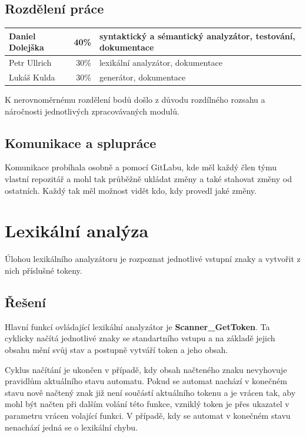 \documentclass[a4paper,11pt]{article}
\begin{document}
\subsection{Rozdělení práce} \label{podrobnosti-rozdeleni}
\noindent
\renewcommand{\arraystretch}{1.2}
\begin{tabular}{ l r l }
	\hline
	Daniel Dolejška	& 40\%	& syntaktický a sémantický analyzátor, testování, dokumentace \\ \hline
	Petr Ullrich	& 30\%	& lexikální analyzátor, dokumentace \\ \hline
	Lukáš Kulda		& 30\%	& generátor, dokumentace \\
	\hline
\end{tabular}

\vspace{4mm}
K nerovnoměrnému rozdělení bodů došlo z důvodu rozdílného rozsahu a náročnosti jednotlivých zpracovávaných modulů.

\subsection{Komunikace a splupráce} \label{podrobnosti-spoluprace}
Komunikace probíhala osobně a pomocí GitLabu, kde měl každý člen týmu vlastní repozitář a mohl tak průběžně ukládat změny a také stahovat změny od ostatních. Každý tak měl možnost vidět kdo, kdy provedl jaké změny.

\newpage
\section{Lexikální analýza} \label{lex}
Úlohou lexikálního analyzátoru je rozpoznat jednotlivé vstupní znaky a vytvořit z nich příslušné tokeny.

\subsection{Řešení} \label{lex-reseni}
Hlavní funkcí ovládající lexikální analyzátor je \textbf{Scanner\_GetToken}. Ta cyklicky načítá jednotlivé znaky se standartního vstupu a na základě jejich obsahu mění svůj stav a postupně vytváří token a jeho obsah.

\vspace{2mm}
Cyklus načítání je ukončen v případě, kdy obsah načteného znaku nevyhovuje pravidlům aktuálního stavu automatu. Pokud se automat nachází v konečném stavu nově načtený znak již není součástí aktuálního tokenu a je vrácen tak, aby mohl být načten při dalším volání této funkce, vzniklý token je přes ukazatel v parametru vrácen volající funkci. V případě, kdy se automat v konečném stavu nenachází jedná se o lexikální chybu.
\end{document}
